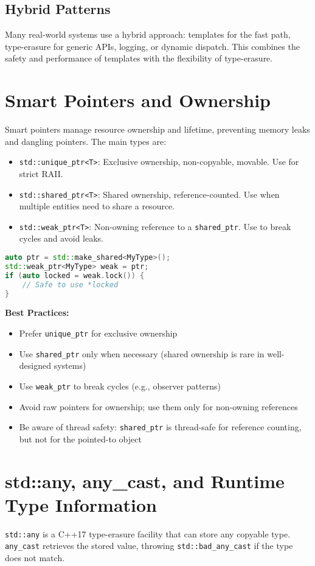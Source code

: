 \documentclass[12pt]{report}
\begin{document}
\subsection{Hybrid Patterns}
Many real-world systems use a hybrid approach: templates for the fast path, type-erasure for generic APIs, logging, or dynamic dispatch. This combines the safety and performance of templates with the flexibility of type-erasure.

\section{Smart Pointers and Ownership}
Smart pointers manage resource ownership and lifetime, preventing memory leaks and dangling pointers. The main types are:

\begin{itemize}
    \item \texttt{std::unique\_ptr<T>}: Exclusive ownership, non-copyable, movable. Use for strict RAII.
    \item \texttt{std::shared\_ptr<T>}: Shared ownership, reference-counted. Use when multiple entities need to share a resource.
    \item \texttt{std::weak\_ptr<T>}: Non-owning reference to a \texttt{shared\_ptr}. Use to break cycles and avoid leaks.
\end{itemize}

\begin{lstlisting}[language=C++]
auto ptr = std::make_shared<MyType>();
std::weak_ptr<MyType> weak = ptr;
if (auto locked = weak.lock()) {
    // Safe to use *locked
}
\end{lstlisting}

\textbf{Best Practices:}
\begin{itemize}
    \item Prefer \texttt{unique\_ptr} for exclusive ownership
    \item Use \texttt{shared\_ptr} only when necessary (shared ownership is rare in well-designed systems)
    \item Use \texttt{weak\_ptr} to break cycles (e.g., observer patterns)
    \item Avoid raw pointers for ownership; use them only for non-owning references
    \item Be aware of thread safety: \texttt{shared\_ptr} is thread-safe for reference counting, but not for the pointed-to object
\end{itemize}

\section{std::any, any\_cast, and Runtime Type Information}
\texttt{std::any} is a C++17 type-erasure facility that can store any copyable type. \texttt{any\_cast} retrieves the stored value, throwing \texttt{std::bad\_any\_cast} if the type does not match.
\end{document}
